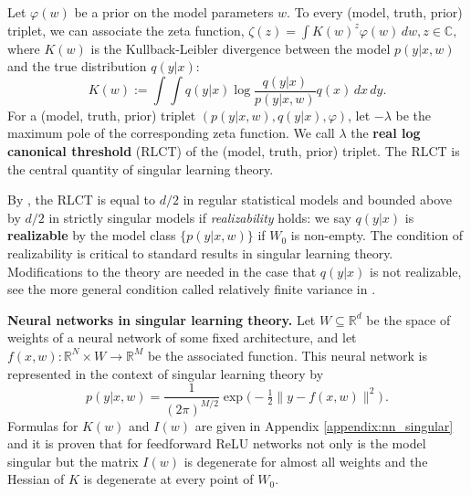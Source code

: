 \documentclass{article} %
\def\lto{\longrightarrow}
\begin{document}
Let  $\varphi(w)$ be a prior on the model parameters $w$.
To every (model, truth, prior) triplet, we can associate the zeta function,
$
\zeta(z) = \int K(w)^z \varphi(w) \,dw, z \in \mathbb C,
$
where $K(w)$ is the Kullback-Leibler divergence between the model $p(y|x,w)$ and the true distribution $q(y|x)$:
\begin{equation}
    K(w) := \int \!\int q(y|x) \log \frac{ q(y|x) }{ p(y|x,w) } q(x) \,dx \,dy.
\label{eq:KL}
\end{equation}
For a (model, truth, prior) triplet $(p(y|x,w),q(y|x),\varphi)$, let $-\lambda$ be the maximum pole of the corresponding zeta function. We call $\lambda$ the \textbf{real log canonical threshold} (RLCT) \citep{watanabe_algebraic_2009} of the (model, truth, prior) triplet. The RLCT is the central quantity of singular learning theory. 

By {\citet[Theorem 6.4]{watanabe_algebraic_2009}}, the RLCT is equal to $d/2$ in regular statistical models and bounded above by $d/2$ in strictly singular models if \textit{realizability} holds:
we say $q(y|x)$ is \textbf{realizable} by the model class $\{p(y|x,w)\}$ if $W_0$ is non-empty.
The condition of realizability is critical to standard results in singular learning theory. Modifications to the theory are needed in the case that $q(y|x)$ is not realizable, see the more general condition called relatively finite variance in \citet{watanabe_mathematical_2018}.

\textbf{Neural networks in singular learning theory.} Let $W \subseteq \mathbb{R}^d$ be the space of weights of a neural network of some fixed architecture, and let $f(x,w): \mathbb{R}^N \times W \lto \mathbb{R}^M$ be the associated function. This neural network is represented in the context of singular learning theory \citep[\S 7.2]{watanabe_algebraic_2009} by
\begin{equation}
p(y|x,w) = \frac{1}{(2 \pi)^{M/2}} \exp\Big(-\tfrac{1}{2} \| y - f(x,w) \|^2 \Big)\,.
\label{eq:gaussian_model_in_w}
\end{equation}
Formulas for $K(w)$ and $I(w)$ are given in Appendix \ref{appendix:nn_singular} and it is proven that for feedforward ReLU networks not only is the model singular but the matrix $I(w)$ is degenerate for almost all weights and the Hessian of $K$ is degenerate at every point of $W_0$.
\end{document}
